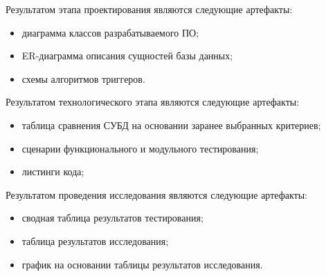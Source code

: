 \documentclass{bmstu}
\begin{document}
	Результатом этапа проектирования являются следующие артефакты:
	\begin{itemize}
		\item диаграмма классов разрабатываемого ПО;
		\item ER-диаграмма описания сущностей базы данных;
		\item схемы алгоритмов триггеров.
	\end{itemize}
	
	Результатом технологического этапа являются следующие артефакты:
	\begin{itemize}
		\item таблица сравнения СУБД на основании заранее выбранных критериев;
		\item сценарии функционального и модульного тестирования;
		\item листинги кода;
	\end{itemize}
	
	Результатом проведения исследования являются следующие артефакты:
	\begin{itemize}
		\item сводная таблица результатов тестирования;
		\item таблица результатов исследования;
		\item график на основании таблицы результатов исследования.
	\end{itemize}
	
	
	
	
\end{document}
